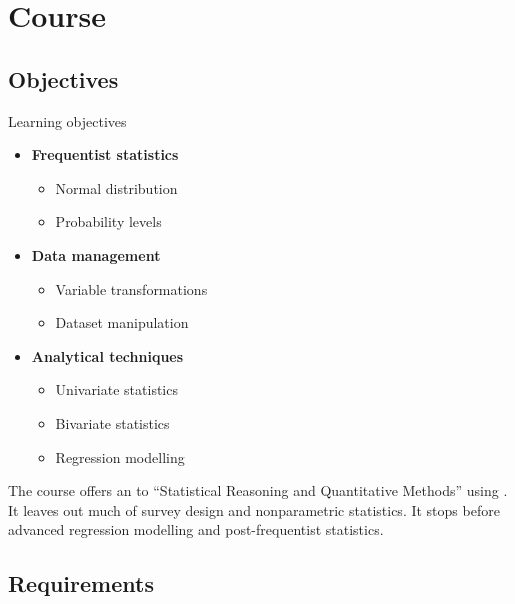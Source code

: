 \documentclass{beamer}
\begin{document}
	
	\section{Course}

	\subsection{Objectives}

	\begin{frame}[t]{Learning objectives}

		\begin{itemize}
			\item \textbf{Frequentist statistics}
			\begin{itemize}
				\item Normal distribution
				\item Probability levels
			\end{itemize}
			\item \textbf{Data management}
			\begin{itemize}
				\item Variable transformations
				\item Dataset manipulation
			\end{itemize}
			\item \textbf{Analytical techniques}
			\begin{itemize}
				\item Univariate statistics
				\item Bivariate statistics
				\item Regression modelling
			\end{itemize}
		\end{itemize}	
		
		The course offers an  to ``Statistical Reasoning and Quantitative Methods'' using . It leaves out much of survey design and nonparametric statistics. It stops before advanced regression modelling and post-frequentist statistics.
	\end{frame}

	\subsection{Requirements}
\end{document}
